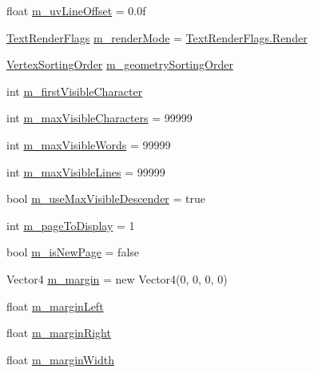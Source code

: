 \begin{DoxyCompactItemize}
\item 
float \mbox{\hyperlink{class_t_m_pro_1_1_t_m_p___text_ad19fa6771ebb732bee757aa81a12e825}{m\+\_\+uv\+Line\+Offset}} = 0.\+0f
\item 
\mbox{\hyperlink{namespace_t_m_pro_ac5a571bdd8e4873a73f2c05b62feff0e}{Text\+Render\+Flags}} \mbox{\hyperlink{class_t_m_pro_1_1_t_m_p___text_a55f026719f4c150e4350953a29a2f963}{m\+\_\+render\+Mode}} = \mbox{\hyperlink{namespace_t_m_pro_ac5a571bdd8e4873a73f2c05b62feff0ea5e520da5341f2fec6d3bbfe7ef357922}{Text\+Render\+Flags.\+Render}}
\item 
\mbox{\hyperlink{namespace_t_m_pro_a29c2b2e41c29850d1bc0760ac64b1ee0}{Vertex\+Sorting\+Order}} \mbox{\hyperlink{class_t_m_pro_1_1_t_m_p___text_afbf9084adc5df057211b0cc6dc5a7013}{m\+\_\+geometry\+Sorting\+Order}}
\item 
int \mbox{\hyperlink{class_t_m_pro_1_1_t_m_p___text_ac7cc5709010cb0178e4e19decdb5cca1}{m\+\_\+first\+Visible\+Character}}
\item 
int \mbox{\hyperlink{class_t_m_pro_1_1_t_m_p___text_ab6c6193bb6128e21e6b490e343229a94}{m\+\_\+max\+Visible\+Characters}} = 99999
\item 
int \mbox{\hyperlink{class_t_m_pro_1_1_t_m_p___text_a05ac7d3bf8bc3f8e2cb8fb82edbc30cb}{m\+\_\+max\+Visible\+Words}} = 99999
\item 
int \mbox{\hyperlink{class_t_m_pro_1_1_t_m_p___text_ad2c75e2335d2498a1b31d2cc7e536efb}{m\+\_\+max\+Visible\+Lines}} = 99999
\item 
bool \mbox{\hyperlink{class_t_m_pro_1_1_t_m_p___text_a11c94cf58a669d5ab05a225856c9a8d4}{m\+\_\+use\+Max\+Visible\+Descender}} = true
\item 
int \mbox{\hyperlink{class_t_m_pro_1_1_t_m_p___text_acf943f5185d1c76c7fcfc682f0276eef}{m\+\_\+page\+To\+Display}} = 1
\item 
bool \mbox{\hyperlink{class_t_m_pro_1_1_t_m_p___text_aaeadc0daa9deefcdf2a8591145c155b5}{m\+\_\+is\+New\+Page}} = false
\item 
Vector4 \mbox{\hyperlink{class_t_m_pro_1_1_t_m_p___text_a6aa9150b2d34b1dc48db04075d8d5748}{m\+\_\+margin}} = new Vector4(0, 0, 0, 0)
\item 
float \mbox{\hyperlink{class_t_m_pro_1_1_t_m_p___text_a89c370fc02263fe73605a5c680d6b6e8}{m\+\_\+margin\+Left}}
\item 
float \mbox{\hyperlink{class_t_m_pro_1_1_t_m_p___text_a96546f88edb9d83f3c17c5bf0d1e1319}{m\+\_\+margin\+Right}}
\item 
float \mbox{\hyperlink{class_t_m_pro_1_1_t_m_p___text_a9e691d455ba71c38d7302f2f241e05c2}{m\+\_\+margin\+Width}}

\end{DoxyCompactItemize}
